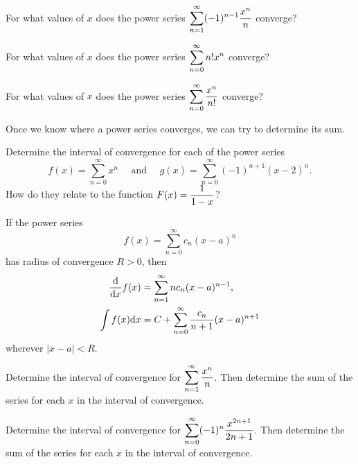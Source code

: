 \newpage

\begin{example}
For what values of $x$ does the power series $\displaystyle\sum_{n=1}^\infty (-1)^{n-1}\frac{x^n}{n}$ converge?
\end{example}

\newpage

\begin{example}
For what values of $x$ does the power series $\displaystyle\sum_{n=0}^\infty n!x^n$ converge?
\end{example}

\newpage

\begin{example}
For what values of $x$ does the power series $\displaystyle\sum_{n=0}^\infty \frac{x^n}{n!}$ converge?
\end{example}

\newpage

\begin{remark}
Once we know where a power series converges, we can try to determine its sum.
\end{remark}

\begin{example}
Determine the interval of convergence for each of the power series
\begin{equation*}
f(x) = \sum_{n=0}^\infty x^n\quad\text{ and }\quad g(x) =\sum_{n=0}^\infty (-1)^{n+1}(x-2)^n.
\end{equation*}
How do they relate to the function $F(x)=\displaystyle\frac{1}{1-x}$?
\end{example}

\newpage

\begin{theorem}
If the power series
\begin{equation*}
f(x) = \sum_{n=0}^\infty c_n(x-a)^n
\end{equation*}
has radius of convergence $R>0$, then
\begin{align*}
\frac{\mathrm{d} }{\mathrm{d} x}f(x) &= \sum_{n=1}^\infty nc_n(x-a)^{n-1},\\
\int f(x)\mathrm{d} x &= C+\sum_{n=0}^\infty \frac{c_n}{n+1}(x-a)^{n+1}
\end{align*}
wherever $|x-a|<R$.
\end{theorem}

\begin{example}
Determine the interval of convergence for $\displaystyle\sum_{n=1}^\infty\frac{x^n}{n}$.
Then determine the sum of the series for each $x$ in the interval of convergence.
\end{example}

\newpage

\begin{example}
Determine the interval of convergence for $\displaystyle\sum_{n=0}^\infty (-1)^n\frac{x^{2n+1}}{2n+1}$.
Then determine the sum of the series for each $x$ in the interval of convergence.
\end{example}
